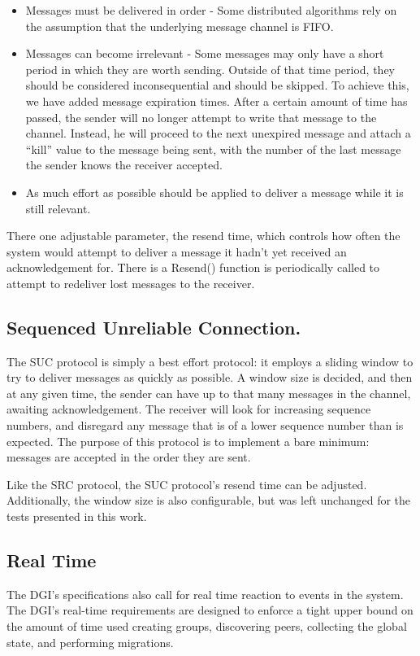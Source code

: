 \begin{itemize}
\item Messages must be delivered in order - Some distributed algorithms rely on 
the assumption that the underlying message channel is FIFO.
\item Messages can become irrelevant - Some messages may only have a short 
period in which they are worth sending. Outside of that time period, they 
should be considered inconsequential and should be skipped. To achieve this, we 
have added message expiration times. After a certain amount of time has passed, 
the sender will no longer attempt to write that message to the channel. 
Instead, he will proceed to the next unexpired message and attach a ``kill'' 
value to the message being sent, with the number of the last message the sender 
knows the receiver accepted.
\item As much effort as possible should be applied to deliver a message while 
it is still relevant.
\end{itemize}

There one adjustable parameter, the resend time, which controls how often the system would attempt to deliver a message it hadn't yet received an acknowledgement for. There is a Resend() function is periodically called to attempt to redeliver lost messages to the receiver. 

\subsection{Sequenced Unreliable Connection.}

The SUC protocol is simply a best effort protocol: it employs a sliding window to try to deliver messages as quickly as possible. A window size is decided, and then at any given time, the sender can have up to that many messages in the channel, awaiting acknowledgement. The receiver will look for increasing sequence numbers, and disregard any message that is of a lower sequence number than is expected. The purpose of this protocol is to implement a bare minimum: messages are accepted in the order they are sent.

Like the SRC protocol, the SUC protocol's resend time can be adjusted. Additionally, the window size is also configurable, but was left unchanged for  the tests presented in this work.

\subsection{Real Time}
The DGI's specifications also call for real time reaction to events in the system. The DGI's real-time requirements are designed to enforce a tight upper bound on the amount of time used creating groups, discovering peers, collecting the global state, and performing migrations.


